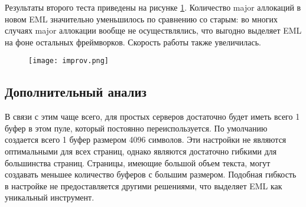 Результаты второго теста приведены на рисунке \ref{fig:optimised}.
Количество major аллокаций в новом EML значительно уменьшилось по сравнению со старым:
во многих случаях major аллокации вообще не осуществлялись, что выгодно выделяет EML на фоне остальных фреймворков.
Скорость работы также увеличилась.

\begin{figure}[h!]
    \texttt{[image: improv.png]}
    \caption{}
    \label{fig:optimised}
\end{figure}

\subsection{Дополнительный анализ}


В связи с этим чаще всего, для простых серверов достаточно будет иметь всего 1 буфер в этом пуле, который постоянно переиспользуется.
По умолчанию создается всего 1 буфер размером 4096 символов.
Эти настройки не являются оптимальными для всех страниц, однако являются достаточно гибкими для большинства страниц.
Страницы, имеющие большой объем текста, могут создавать меньшее количество буферов с большим размером.
Подобная гибкость в настройке не предоставляется другими решениями, что выделяет EML как уникальный инструмент.


